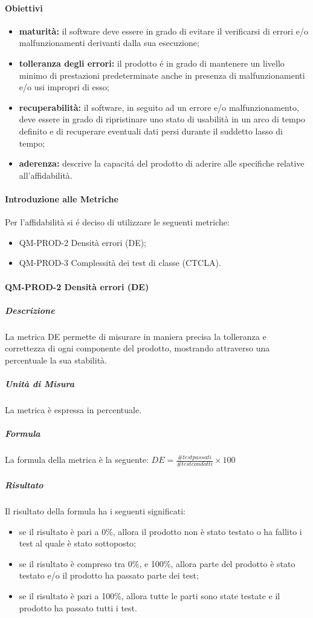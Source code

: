 			\paragraph{Obiettivi}
				\begin{itemize}
					\item \textbf{maturità:} il software deve essere in grado di evitare il verificarsi di errori e/o malfunzionamenti derivanti dalla sua esecuzione;
					\item \textbf{tolleranza degli errori:} il prodotto é in grado di mantenere un livello minimo di prestazioni predeterminate anche in presenza di malfunzionamenti e/o usi impropri di esso;
					\item \textbf{recuperabilità:} il software, in seguito ad un errore e/o malfunzionamento, deve essere in grado di ripristinare uno stato di usabilità in un arco di tempo definito e di recuperare eventuali dati persi durante il suddetto lasso di tempo;
					\item \textbf{aderenza:} descrive la capacitá del prodotto di aderire alle specifiche relative all'affidabilità.
				\end{itemize}
			\paragraph{Introduzione alle Metriche}
				Per l'affidabilità si é deciso di utilizzare le seguenti metriche:
				\begin{itemize}
					\item QM-PROD-2 Densità errori (DE);
					\item QM-PROD-3 Complessità dei test di classe (CTCLA).
				\end{itemize}
			\paragraph{ QM-PROD-2 Densità errori (DE)}
				\subparagraph{Descrizione}
					La metrica DE permette di misurare in maniera precisa la tolleranza e correttezza di ogni componente del prodotto, mostrando attraverso una percentuale la sua stabilità.
				\subparagraph{Unità di Misura}
					La metrica è espressa in percentuale.
				\subparagraph{Formula}
					La formula della metrica è la seguente:
					\(DE = \frac{\# test passati}{\# test condotti}\times100\)
				\subparagraph{Risultato}
					Il risultato della formula ha i seguenti significati:
					\begin{itemize}
						\item se il risultato è pari a 0\%, allora il prodotto non è stato testato o ha fallito i test al quale è stato sottoposto;
						\item se il risultato è compreso tra 0\%, e 100\%, allora parte del prodotto è stato testato e/o il prodotto ha passato parte dei test;
						\item se il risultato è pari a 100\%, allora tutte le parti sono state testate e il prodotto ha passato tutti i test.
					\end{itemize}

